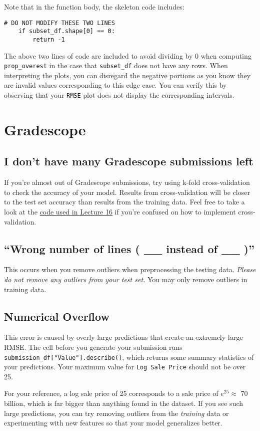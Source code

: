 \documentclass[
  letterpaper,
  DIV=11,
  numbers=noendperiod]{scrreprt}
\begin{document}
Note that in the function body, the skeleton code includes:

\begin{verbatim}
# DO NOT MODIFY THESE TWO LINES
    if subset_df.shape[0] == 0:
        return -1
\end{verbatim}

The above two lines of code are included to avoid dividing by 0 when
computing \texttt{prop\_overest} in the case that \texttt{subset\_df}
does not have any rows. When interpreting the plots, you can disregard
the negative portions as you know they are invalid values corresponding
to this edge case. You can verify this by observing that your
\texttt{RMSE} plot does not display the corresponding intervals.

\section{Gradescope}\label{gradescope-1}

\subsection{I don't have many Gradescope submissions
left}\label{i-dont-have-many-gradescope-submissions-left}

If you're almost out of Gradescope submissions, try using k-fold
cross-validation to check the accuracy of your model. Results from
cross-validation will be closer to the test set accuracy than results
from the training data. Feel free to take a look at the
\href{https://ds100.org/sp24/resources/assets/lectures/lec16/lec16.html}{code
used in Lecture 16} if you're confused on how to implement
cross-validation.

\subsection{``Wrong number of lines ( \_\_ instead of \_\_
)''}\label{wrong-number-of-lines-__-instead-of-__}

This occurs when you remove outliers when preprocessing the testing
data. \emph{Please do not remove any outliers from your test set.} You
may only remove outliers in training data.

\subsection{Numerical Overflow}\label{numerical-overflow}

This error is caused by overly large predictions that create an
extremely large RMSE. The cell before you generate your submission runs
\texttt{submission\_df{[}"Value"{]}.describe()}, which returns some
summary statistics of your predictions. Your maximum value for
\texttt{Log\ Sale\ Price} should not be over 25.

For your reference, a log sale price of 25 corresponds to a sale price
of \(e^{25} \approx\) 70 billion, which is far bigger than anything
found in the dataset. If you see such large predictions, you can try
removing outliers from the \emph{training} data or experimenting with
new features so that your model generalizes better.
\end{document}
